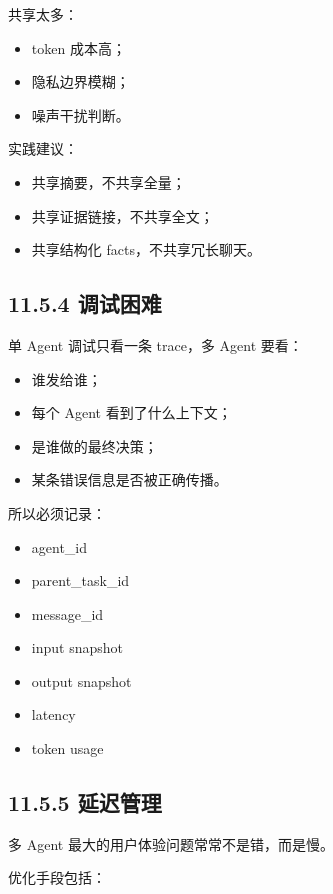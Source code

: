 共享太多：


\begin{itemize}[leftmargin=2em]
\item token 成本高；
\item 隐私边界模糊；
\item 噪声干扰判断。
\end{itemize}

实践建议：


\begin{itemize}[leftmargin=2em]
\item 共享摘要，不共享全量；
\item 共享证据链接，不共享全文；
\item 共享结构化 facts，不共享冗长聊天。
\end{itemize}

\subsection{11.5.4 调试困难}

单 Agent 调试只看一条 trace，多 Agent 要看：


\begin{itemize}[leftmargin=2em]
\item 谁发给谁；
\item 每个 Agent 看到了什么上下文；
\item 是谁做的最终决策；
\item 某条错误信息是否被正确传播。
\end{itemize}

所以必须记录：


\begin{itemize}[leftmargin=2em]
\item agent\_id
\item parent\_task\_id
\item message\_id
\item input snapshot
\item output snapshot
\item latency
\item token usage
\end{itemize}

\subsection{11.5.5 延迟管理}

多 Agent 最大的用户体验问题常常不是错，而是慢。


优化手段包括：


